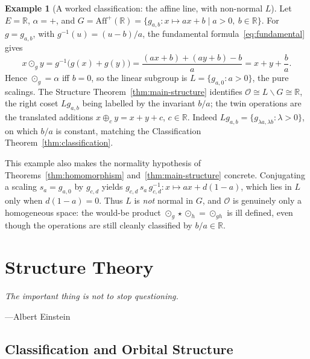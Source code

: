 \documentclass[11pt,a4paper,openany]{book}
\theoremstyle{plain}
\theoremstyle{definition}
\newtheorem{example}[theorem]{Example}
\newcommand{\twing}[1]{\odot_{#1}}
\newcommand{\opspace}{\mathcal{O}}
\newcommand{\lingroup}{L}
\newcommand{\actspace}{E}
\newcommand{\groupG}{G}
\newcommand{\RR}{\mathbb{R}}
\begin{document}
\begin{example}[A worked classification: the affine line, with non-normal $\lingroup$]\label{ex:affine-classification}
Let $\actspace=\RR$, $\alpha=+$, and $\groupG=\mathrm{Aff}^{+}(\RR)=\{g_{a,b}:x\mapsto ax+b\mid a>0,\ b\in\RR\}$.
For $g=g_{a,b}$, with $g^{-1}(u)=(u-b)/a$, the fundamental formula~\eqref{eq:fundamental} gives
\[
x\twing{g}y=g^{-1}\big(g(x)+g(y)\big)=\frac{(ax+b)+(ay+b)-b}{a}=x+y+\frac{b}{a}.
\]
Hence $\twing{g}=\alpha$ iff $b=0$, so the linear subgroup is $\lingroup=\{g_{a,0}:a>0\}$, the pure scalings.
The Structure Theorem~\ref{thm:main-structure} identifies $\opspace\cong\lingroup\backslash\groupG\cong\RR$, the
right coset $\lingroup g_{a,b}$ being labelled by the invariant $b/a$; the twin operations are the translated
additions $x\oplus_c y=x+y+c$, $c\in\RR$. Indeed $\lingroup g_{a,b}=\{g_{\lambda a,\lambda b}:\lambda>0\}$, on which
$b/a$ is constant, matching the Classification Theorem~\ref{thm:classification}.

This example also makes the normality hypothesis of Theorems~\ref{thm:homomorphism}
and~\ref{thm:main-structure} concrete. Conjugating a scaling $s_a=g_{a,0}$ by $g_{c,d}$ yields
$g_{c,d}\,s_a\,g_{c,d}^{-1}:x\mapsto ax+d(1-a)$, which lies in $\lingroup$ only when $d(1-a)=0$. Thus $\lingroup$
is \emph{not} normal in $\groupG$, and $\opspace$ is genuinely only a homogeneous space: the would-be product
$\twing{g}\star\twing{h}=\twing{gh}$ is ill defined, even though the operations are still cleanly classified by
$b/a\in\RR$.
\end{example}


\part{Structure Theory}
\label{part:structure}

\epigraph{\itshape The important thing is not to stop questioning.}{---Albert Einstein}


\chapter{Classification and Orbital Structure}
\label{ch:orbital}
\end{document}

